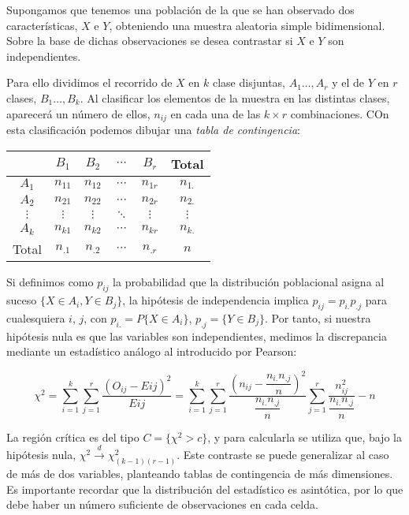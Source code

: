 Supongamos que tenemos una poblaci\'on de la que se han observado dos caracter\'isticas, $X$ e $Y$, obteniendo una muestra aleatoria simple bidimensional. Sobre la base de dichas observaciones se desea contrastar si $X$ e $Y$ son independientes.

Para ello dividimos el recorrido de $X$ en $k$ clase disjuntas, $A_1\ldots,A_r$ y el de $Y$ en $r$ clases, $B_1\ldots,B_k$. Al clasificar los elementos de la muestra en las distintas clases, aparecer\'a un n\'umero de ellos, $n_{ij}$ en cada una de las $k\times r$ combinaciones. COn esta clasificaci\'on podemos dibujar una \textit{tabla de contingencia}:






\begin{tabular}{|c|cccc|c|}
\hline 
 & $B_1$ & $B_2$ & $\cdots$ & $B_r$ & Total \tabularnewline
\hline 
$A_1$ & $n_{11}$ & $n_{12}$ & $\cdots$ & $n_{1r}$ & $n_{1.}$ \tabularnewline
$A_2$ & $n_{21}$ & $n_{22}$ & $\cdots$ & $n_{2r}$ & $n_{2.}$ \tabularnewline
$\vdots$ & $\vdots$ & $\vdots$ & $\ddots$ & $\vdots$ & $\vdots$ \tabularnewline
$A_k$ & $n_{k1}$ & $n_{k2}$ & $\cdots$ & $n_{kr}$ & $n_{k.}$ \tabularnewline
\hline 
Total  & $n_{.1}$ & $n_{.2}$ & $\cdots$ & $n_{.r}$ & $n$ \tabularnewline
\hline 
\end{tabular}

Si definimos como $p_{ij}$ la probabilidad que la distribuci\'on poblacional asigna al suceso $\{X\in A_i, Y\in B_j\}$, la hip\'otesis de independencia implica $p_{ij}=p_{i.}p_{.j}$ para cualesquiera $i$, $j$, con $p_{i.}=P\{X\in A_i\}$, $p_{.j}=\{Y\in B_j\}$. Por tanto, si nuestra hip\'otesis nula es que las variables son independientes, medimos la discrepancia mediante un estad\'istico an\'alogo al introducido por Pearson:

\[\chi^2=\sum_{i=1}^k\sum_{j=1}^r\dfrac{\left(O_{ij}-E{ij}\right)^2}{E{ij}}=\sum_{i=1}^k\sum_{j=1}^r\dfrac{\left(n_{ij}-\dfrac{n_{i.}n_{.j}}{n}\right)^2}{\dfrac{n_{i.}n_{.j}}{n}}\sum_{j=1}^r\dfrac{n_{ij}^2}{\dfrac{n_{i.}n_{.j}}{n}}-n\]

La regi\'on cr\'itica es del tipo $C=\{\chi^2>c\}$, y para calcularla se utiliza que, bajo la hip\'otesis nula, $\chi^2\overset{d}{\to}\chi^2_{(k-1)(r-1)}$. Este contraste se puede generalizar al caso de m\'as de dos variables, planteando tablas de contingencia de m\'as dimensiones. Es importante recordar que la distribuci\'on del estad\'istico es asint\'otica, por lo que debe haber un n\'umero suficiente de observaciones en cada celda.


